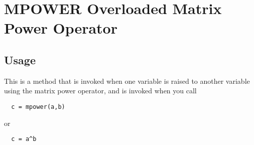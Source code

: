 \section{MPOWER Overloaded Matrix Power Operator}

\subsection{Usage}

This is a method that is invoked when one variable is raised
to another variable using the matrix power operator, and
is invoked when you call
\begin{verbatim}
  c = mpower(a,b)
\end{verbatim}
or
\begin{verbatim}
  c = a^b
\end{verbatim}
